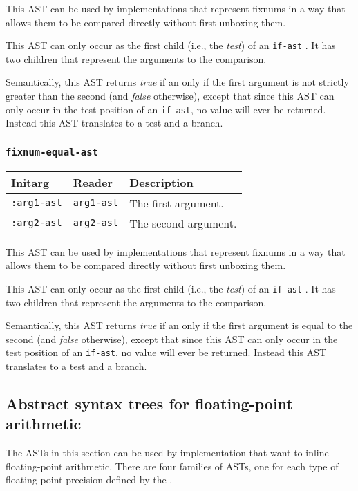 This AST can be used by implementations that represent fixnums in a
way that allows them to be compared directly without first unboxing
them.

This AST can only occur as the first child (i.e., the \emph{test}) of
an \texttt{if-ast} .  It has two children that
represent the arguments to the comparison.

Semantically, this AST returns \emph{true} if an only if the first
argument is not strictly greater than the second (and \emph{false}
otherwise), except that since this AST can only occur in the test
position of an \texttt{if-ast}, no value will ever be returned.
Instead this AST translates to a test and a branch.

\subsubsection{\texttt{fixnum-equal-ast}}
\label{fixnum-equal-ast}

\begin{tabular}{|l|l|l|}
\hline
Initarg & Reader & Description\\
\hline\hline
\texttt{:arg1-ast} & \texttt{arg1-ast} & The first argument.\\
\hline
\texttt{:arg2-ast} & \texttt{arg2-ast} & The second argument.\\
\hline
\end{tabular}

This AST can be used by implementations that represent fixnums in a
way that allows them to be compared directly without first unboxing
them.

This AST can only occur as the first child (i.e., the \emph{test}) of
an \texttt{if-ast} .  It has two children that
represent the arguments to the comparison.

Semantically, this AST returns \emph{true} if an only if the first
argument is equal to the second (and \emph{false} otherwise), except
that since this AST can only occur in the test position of an
\texttt{if-ast}, no value will ever be returned.  Instead this AST
translates to a test and a branch.

\subsection{Abstract syntax trees for floating-point arithmetic}
\label{sec-ast-floating-point-arithmetic}

The ASTs in this section can be used by implementation that want to
inline floating-point arithmetic.  There are four families of ASTs,
one for each type of floating-point precision defined by the \hs{}.

